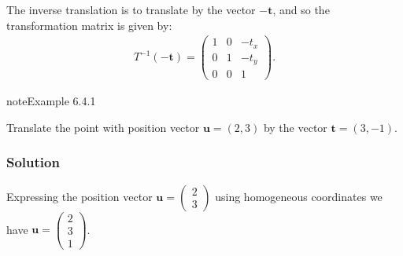 \documentclass[letterpaper,10pt,english]{jupyterBook}
\begin{document}
\sphinxAtStartPar
The inverse translation is to translate by the vector \(-\mathbf{t}\), and so the transformation matrix is given by:
\begin{equation*}
\begin{split} T^{-1}(-\mathbf{t}) =
\begin{pmatrix}
    1 & 0 & -t_x \\
    0 & 1 & -t_y \\
    0 & 0 & 1
\end{pmatrix}. \end{split}
\end{equation*}\label{_pages/6.4_Translation:translation-example}
\begin{sphinxadmonition}{note}{Example 6.4.1}



\sphinxAtStartPar
Translate the point with position vector \(\mathbf{u} = (2, 3)\) by the vector \(\mathbf{t} = (3, -1)\).
\subsubsection*{Solution}

\sphinxAtStartPar
Expressing the position vector \(\mathbf{u} = \begin{pmatrix} 2 \\ 3 \end{pmatrix}\) using homogeneous co\sphinxhyphen{}ordinates we have \(\mathbf{u} = \begin{pmatrix} 2 \\ 3 \\ 1 \end{pmatrix}\).


\end{sphinxadmonition}
\end{document}
